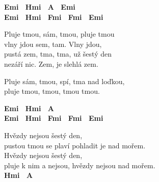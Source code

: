 
\re{}
\begin{footnotesize}
\textbf{Emi \ Hmi \ A \ Emi\\
Emi \ Hmi \ F\guitarSharp{}mi \ F\guitarSharp{}mi \ Emi}
\end{footnotesize}

\re{}
Pluje tmou, sám, tmou, pluje tmou\\
vlny jdou sem, tam. Vlny jdou,\\
pustá zem, tma, tma, už šestý den\\
nezáří nic. Zem, je slehlá zem.

Pluje sám, tmou, spí, tma nad loďkou,\\
pluje tmou, tmou, tmou  \quad {}tmou.

\begin{footnotesize}
\textbf{Emi \ Hmi \ A\\
Emi \ Hmi \ F\guitarSharp{}mi \ F\guitarSharp{}mi \ Emi}
\end{footnotesize}

Hvězdy nejsou šestý den,\\
pustou tmou se plaví pohladit je nad mořem.\\
Hvězdy nejsou šestý den,\\
pluje k nim a nejsou, hvězdy nejsou nad mořem.\\
{\footnotesize \textbf{Hmi \ A }}

\esong{}